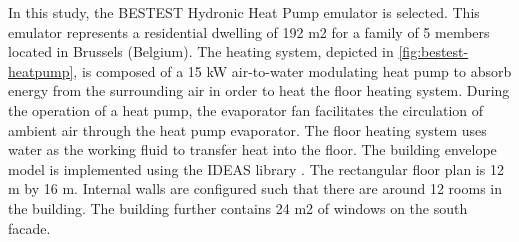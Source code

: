 In this study, the BESTEST Hydronic Heat Pump emulator is selected. This emulator represents a residential dwelling of 192 m2 for a family of 5 members located in Brussels (Belgium).  The heating system, depicted in \ref{fig:bestest-heatpump}, is composed of a 15 kW air-to-water modulating heat pump to absorb energy from the surrounding air in order to heat the floor heating system. During the operation of a heat pump, the evaporator fan facilitates the circulation of ambient air through the heat pump evaporator. The floor heating system uses water as the working fluid to transfer heat into the floor. The building envelope model is implemented using the IDEAS library \cite{Jorissen2018}. The rectangular floor plan is 12 m by 16 m. Internal walls are configured such that there are around 12 rooms in the building. The building further contains 24 m2 of windows on the south facade.

